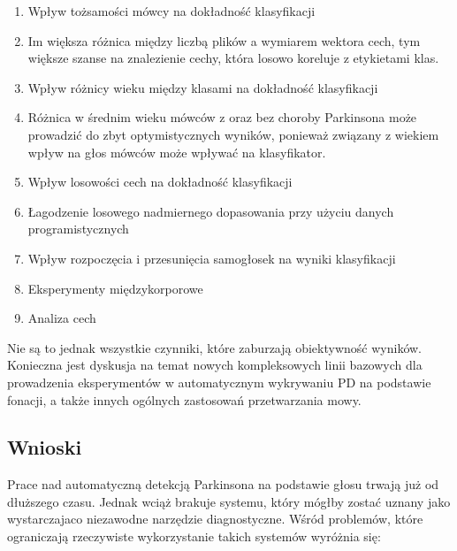 \begin{enumerate}[label={\alph*)}]
	\item Wpływ tożsamości mówcy na dokładność klasyfikacji
	\item[] Im większa różnica między liczbą plików a wymiarem wektora cech, tym większe szanse na znalezienie cechy, która losowo koreluje z etykietami klas.
  	\item Wpływ różnicy wieku między klasami na dokładność klasyfikacji
	\item[] Różnica w średnim wieku mówców z oraz bez choroby Parkinsona może prowadzić do zbyt optymistycznych wyników, ponieważ
związany z wiekiem wpływ na głos mówców może wpływać na klasyfikator.

  	\item Wpływ losowości cech na dokładność klasyfikacji
  	\item Łagodzenie losowego nadmiernego dopasowania przy użyciu danych programistycznych
	\item Wpływ rozpoczęcia i przesunięcia samogłosek na wyniki klasyfikacji
 	\item Eksperymenty międzykorporowe
	\item Analiza cech
\end{enumerate}





Nie są to jednak wszystkie czynniki, które zaburzają obiektywność wyników. Konieczna jest dyskusja na temat nowych
kompleksowych linii bazowych dla prowadzenia eksperymentów w automatycznym wykrywaniu PD na podstawie fonacji,
a także innych ogólnych zastosowań przetwarzania mowy.


\subsection{Wnioski}
\label{subsec:wnioski}

Prace nad automatyczną detekcją Parkinsona na podstawie głosu trwają już od dłuższego czasu.
Jednak wciąż brakuje systemu, który mógłby zostać uznany jako wystarczajaco niezawodne narzędzie diagnostyczne.
Wśród problemów, które ograniczają rzeczywiste wykorzystanie takich systemów wyróżnia się:


